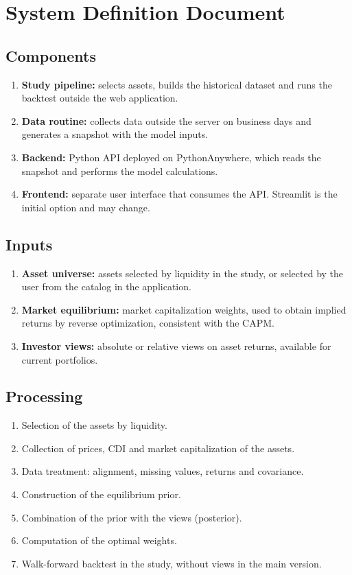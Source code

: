 \chapter{System Definition Document}

\section{Components}
\begin{enumerate}
  \item \textbf{Study pipeline:} selects assets, builds the historical dataset and runs the backtest
        outside the web application.
  \item \textbf{Data routine:} collects data outside the server on business days and generates a
        snapshot with the model inputs.
  \item \textbf{Backend:} Python API deployed on PythonAnywhere, which reads the snapshot and
        performs the model calculations.
  \item \textbf{Frontend:} separate user interface that consumes the API. Streamlit is the initial
        option and may change.
\end{enumerate}

\section{Inputs}
\begin{enumerate}
  \item \textbf{Asset universe:} assets selected by liquidity in the study, or selected by the user
        from the catalog in the application.
  \item \textbf{Market equilibrium:} market capitalization weights, used to obtain implied returns
        by reverse optimization, consistent with the CAPM.
  \item \textbf{Investor views:} absolute or relative views on asset returns, available for current
        portfolios.
\end{enumerate}

\section{Processing}
\begin{enumerate}
  \item Selection of the assets by liquidity.
  \item Collection of prices, CDI and market capitalization of the assets.
  \item Data treatment: alignment, missing values, returns and covariance.
  \item Construction of the equilibrium prior.
  \item Combination of the prior with the views (posterior).
  \item Computation of the optimal weights.
  \item Walk-forward backtest in the study, without views in the main version.
\end{enumerate}

